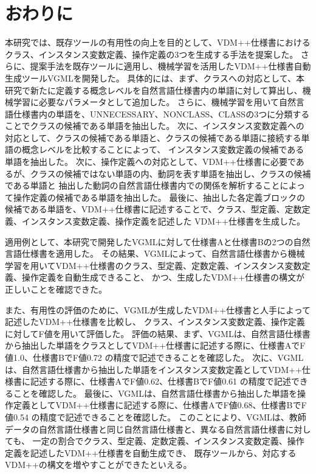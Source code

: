 \chapter{おわりに}\label{cha:Conclusion}

本研究では、既存ツールの有用性の向上を目的として、VDM++仕様書におけるクラス、インスタンス変数定義、操作定義の3つを生成する手法を提案した。
さらに、提案手法を既存ツールに適用し、機械学習を活用したVDM++仕様書自動生成ツールVGMLを開発した。
具体的には、まず、クラスへの対応として、本研究で新たに定義する概念レベルを自然言語仕様書内の単語に対して算出し、機械学習に必要なパラメータとして追加した。
さらに、機械学習を用いて自然言語仕様書内の単語を、UNNECESSARY、NONCLASS、CLASSの3つに分類することでクラスの候補である単語を抽出した。
次に、インスタンス変数定義への対応として、クラスの候補である単語と、クラスの候補である単語に接続する単語の概念レベルを比較することによって、
インスタンス変数定義の候補である単語を抽出した。
次に、操作定義への対応として、VDM++仕様書に必要であるが、クラスの候補ではない単語の内、動詞を表す単語を抽出し、クラスの候補である単語と
抽出した動詞の自然言語仕様書内での関係を解析することによって操作定義の候補である単語を抽出した。
最後に、抽出した各定義ブロックの候補である単語を、VDM++仕様書に記述することで、クラス、型定義、定数定義、インスタンス変数定義、操作定義を記述した
VDM++仕様書を生成した。

適用例として、本研究で開発したVGMLに対して仕様書Aと仕様書Bの2つの自然言語仕様書を適用した。
その結果、VGMLによって、自然言語仕様書から機械学習を用いてVDM++仕様書のクラス、型定義、定数定義、インスタンス変数定義、操作定義を自動生成できること、
かつ、生成したVDM++仕様書の構文が正しいことを確認できた。

また、有用性の評価のために、VGMLが生成したVDM++仕様書と人手によって記述したVDM++仕様書を比較し、
クラス、インスタンス変数定義、操作定義に対してF値を用いて評価した。
評価の結果、まず、VGMLは、自然言語仕様書から抽出した単語をクラスとしてVDM++仕様書に記述する際に、仕様書AでF値1.0、仕様書BでF値0.72
の精度で記述できることを確認した。
次に、VGMLは、自然言語仕様書から抽出した単語をインスタンス変数定義としてVDM++仕様書に記述する際に、仕様書AでF値0.62、仕様書BでF値0.61
の精度で記述できることを確認した。
最後に、VGMLは、自然言語仕様書から抽出した単語を操作定義としてVDM++仕様書に記述する際に、仕様書AでF値0.68、仕様書BでF値0.54
の精度で記述できることを確認した。
このことにより、VGMLは、教師データの自然言語仕様書と同じ自然言語仕様書と、異なる自然言語仕様書に対しても、
一定の割合でクラス、型定義、定数定義、インスタンス変数定義、操作定義を記述したVDM++仕様書を自動生成でき、
既存ツールから、対応するVDM++の構文を増やすことができたといえる。


